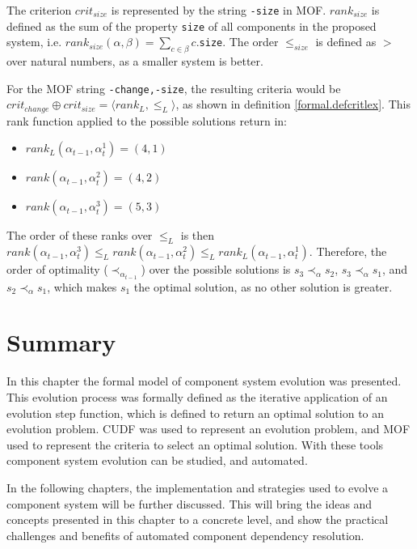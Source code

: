 The criterion $crit_{size}$ is represented by the string \verb+-size+ in MOF.
$rank_{size}$ is defined as the sum of the property \verb+size+ of all components in the  proposed system, i.e. $rank_{size}(\alpha,\beta) = \sum_{c \in \beta} c$.\verb+size+.
The order $\leq_{size}$ is defined as $>$ over natural numbers, as a smaller system is better. 

For the MOF string \verb+-change,-size+, the resulting criteria would be $crit_{change} \oplus crit_{size} = \langle rank_L, \leq_L \rangle$, as shown in definition \ref{formal.defcritlex}.
This rank function applied to the possible solutions return in:
\begin{itemize}
  \item $rank_L(\alpha_{t-1},\alpha_t^1 ) = (4, 1)$
  \item $rank(\alpha_{t-1},\alpha_t^2 ) = (4, 2)$
  \item $rank(\alpha_{t-1},\alpha_t^3 ) = (5, 3)$
\end{itemize}
The order of these ranks over $\leq_L$ is then $rank(\alpha_{t-1},\alpha_t^3) \leq_L rank(\alpha_{t-1},\alpha_t^2) \leq_L rank_L(\alpha_{t-1},\alpha_t^1)$.
Therefore, the order of optimality ($\prec_{\alpha_{t-1}}$) over the possible solutions is $s_3 \prec_{\alpha} s_2$, $s_3 \prec_{\alpha} s_1$, and $s_2 \prec_{\alpha} s_1$,
which makes $s_1$ the optimal solution, as no other solution is greater. 

\section{Summary}
In this chapter the formal model of component system evolution was presented.
This evolution process was formally defined as the iterative application of an evolution step function,
which is defined to return an optimal solution to an evolution problem.
CUDF was used to represent an evolution problem, and MOF used to represent the criteria to select an optimal solution.
With these tools component system evolution can be studied, and automated.

In the following chapters, the implementation and strategies used to evolve a component system will be further discussed.
This will bring the ideas and concepts presented in this chapter to a concrete level, and show the practical challenges and benefits of automated component dependency resolution. 